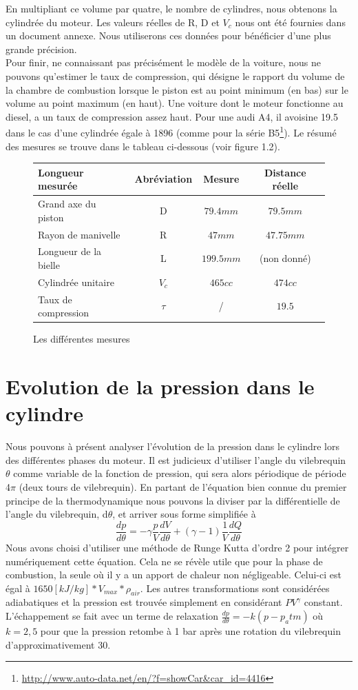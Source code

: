 \documentclass[a4paper,oneside,12pt]{report}
\begin{document}
En multipliant ce volume par quatre, le nombre de cylindres, nous obtenons la cylindrée du moteur. Les valeurs réelles de R, D et $V_c$ nous ont été fournies dans un document annexe. Nous utiliserons ces données pour bénéficier d'une plus grande précision.\\

Pour finir, ne connaissant pas précisément le modèle de la voiture, nous ne pouvons qu'estimer le taux de compression, qui désigne le rapport du volume de la chambre de combustion lorsque le piston est au point minimum (en bas) sur le volume au point maximum (en haut). Une voiture dont le moteur fonctionne au diesel, a un taux de compression assez haut. Pour une audi A4, il avoisine 19.5 dans le cas d'une cylindrée égale à 1896 (comme pour la série
B5\footnote{\url{http://www.auto-data.net/en/?f=showCar&car_id=4416}}). Le résumé des mesures se trouve dans le tableau ci-dessous (voir figure 1.2).

\begin{figure}[h]
\centering
\begin{tabular}{|l|c|c|c|}
  \hline
  Longueur mesurée & Abréviation & Mesure & Distance réelle\\
  \hline
  Grand axe du piston & D & $79.4mm$ & $79.5mm$ \\
  Rayon de manivelle & R & $47mm$ & $47.75mm$\\
  Longueur de la bielle & L & $199.5mm$ & (non donné)\\
  Cylindrée unitaire & $V_c$  & $465cc$ & $474cc$\\
  Taux de compression & $\tau$ & / & $19.5$\\
  \hline
\end{tabular}
\caption{Les différentes mesures}
\end{figure}

\section{Evolution de la pression dans le cylindre}

Nous pouvons à présent analyser l'évolution de la pression dans le cylindre lors des différentes phases du moteur. Il est judicieux d'utiliser l'angle du vilebrequin $\theta$ comme variable de la fonction de pression, qui sera alors périodique de période 4$\pi$ (deux tours de vilebrequin). En partant de l'équation bien connue du premier principe de la thermodynamique nous pouvons la diviser par la différentielle de l'angle du vilebrequin, d$\theta$, et arriver sous forme simplifiée à
$$\frac{dp}{d\theta}=-\gamma\frac{p}{V}\frac{dV}{d\theta}+(\gamma - 1) \frac{1}{V}\frac{dQ}{d\theta}$$
Nous avons choisi d'utiliser une méthode de Runge Kutta d'ordre 2 pour intégrer numériquement cette équation. Cela ne se révèle utile que pour la phase de combustion, la seule où il y a un apport de chaleur non négligeable. Celui-ci est égal à $1650[kJ/kg] * V_{max} * \rho_{air}$. Les autres transformations sont considérées adiabatiques et la pression est trouvée simplement en considérant $PV^{\gamma}$ constant. L'échappement se fait avec un terme de relaxation $\frac{dp}{d\theta}=-k(p-p_atm)$ où $k=2,5$ pour que la pression retombe à 1 bar après une rotation du vilebrequin d'approximativement 30\degre.
\end{document}
